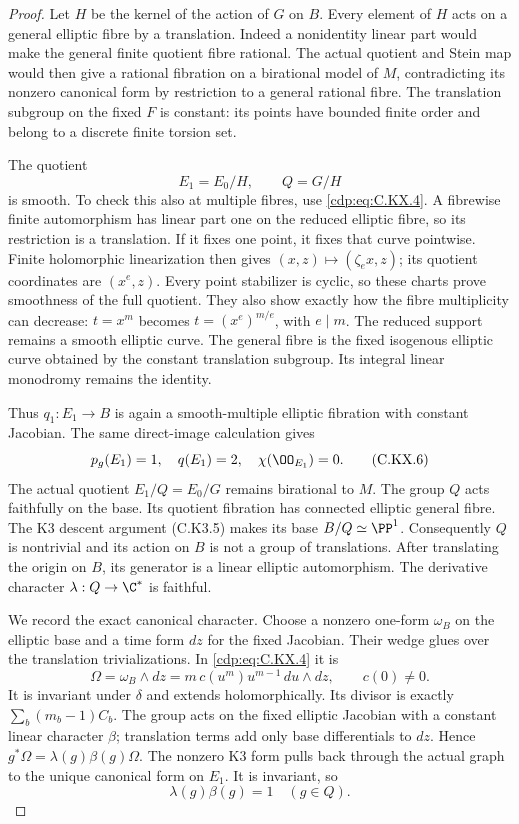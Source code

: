 \begin{proof}
Let $H$ be the kernel of the
action of $G$ on $B$.
Every element of $H$ acts
on a general elliptic fibre
by a translation. Indeed
a nonidentity linear part
would make the general
finite quotient fibre
rational. The actual
quotient and Stein map
would then give a rational
fibration on a birational
model of $M$, contradicting
its nonzero canonical form
by restriction to a general
rational fibre.
The translation subgroup
on the fixed $F$ is
constant: its points have
bounded finite order and
belong to a discrete
finite torsion set.

The quotient
\[
              E_1=E_0/H,\qquad Q=G/H
                                                               \tag{C.KX.5}\label{cdp:eq:C.KX.5}
\]
is smooth. To check this
also at multiple fibres,
use \eqref{cdp:eq:C.KX.4}. A fibrewise
finite automorphism has
linear part one on the
reduced elliptic fibre,
so its restriction is
a translation. If it
fixes one point, it
fixes that curve pointwise.
Finite holomorphic
linearization then gives
$(x,z)\mapsto(\zeta_e x,z)$;
its quotient coordinates
are $(x^e,z)$. Every
point stabilizer is
cyclic, so these charts
prove smoothness of the
full quotient. They also
show exactly how the
fibre multiplicity can
decrease: $t=x^m$ becomes
$t=(x^e)^{m/e}$, with
$e\mid m$. The reduced
support remains a smooth
elliptic curve. The
general fibre is the
fixed isogenous elliptic
curve obtained by the
constant translation
subgroup. Its integral
linear monodromy remains
the identity.

Thus $q_1:E_1\to B$ is
again a smooth-multiple
elliptic fibration with
constant Jacobian.
The same direct-image
calculation gives
\[
 p_g(E_1)=1,\quad q(E_1)=2,\quad
                 \chi(\OO_{E_1})=0 .
                                                               \tag{C.KX.6}\label{cdp:eq:C.KX.6}
\]
The actual quotient
$E_1/Q=E_0/G$ remains
birational to $M$.
The group $Q$ acts
faithfully on the base.
Its quotient fibration
has connected elliptic
general fibre. The
K3 descent argument
(C.K3.5) makes its
base $B/Q\simeq\PP^1$.
Consequently $Q$ is
nontrivial and its
action on $B$ is not
a group of translations.
After translating the
origin on $B$, its
generator is a linear
elliptic automorphism.
The derivative character
$\lambda:Q\to\C^*$ is
faithful.

We record the exact
canonical character.
Choose a nonzero
one-form $\omega_B$
on the elliptic base
and a time form $dz$
for the fixed Jacobian.
Their wedge glues
over the translation
trivializations. In
\eqref{cdp:eq:C.KX.4} it is
\[
 \Omega=\omega_B\wedge dz
        =m\,c(u^m)u^{m-1}\,du\wedge dz ,
                  \qquad c(0)\ne0 .
                                                               \tag{C.KX.7}\label{cdp:eq:C.KX.7}
\]
It is invariant under
$\delta$ and extends
holomorphically. Its
divisor is exactly
$\sum_b(m_b-1)C_b$.
The group acts on
the fixed elliptic
Jacobian with a
constant linear
character $\beta$;
translation terms
add only base
differentials to $dz$.
Hence
$g^*\Omega=\lambda(g)\beta(g)\Omega$.
The nonzero K3 form
pulls back through
the actual graph to
the unique canonical
form on $E_1$.
It is invariant, so
\[
                   \lambda(g)\beta(g)=1
                       \quad(g\in Q).                \tag{C.KX.8}\label{cdp:eq:C.KX.8}
\]


\end{proof}
